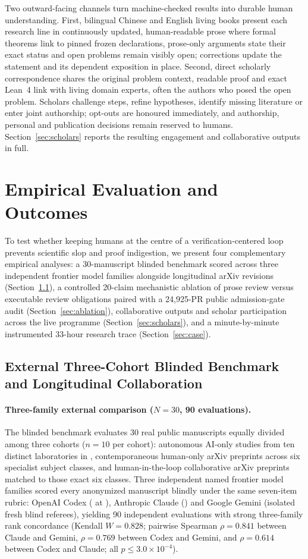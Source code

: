 \documentclass[11pt,a4paper]{article}
\newcommand{\code}[1]{\texttt{\detokenize{#1}}}
\begin{document}
Two outward-facing channels turn machine-checked results into durable human
understanding. First, bilingual Chinese and English living books present each
research line in continuously updated, human-readable prose where formal
theorems link to pinned frozen declarations, prose-only arguments state their
exact status and open problems remain visibly open; corrections update the
statement and its dependent exposition in place. Second, direct scholarly
correspondence shares the original problem context, readable proof and exact
Lean~4 link with living domain experts, often the authors who posed the open
problem. Scholars challenge steps, refine hypotheses, identify missing
literature or enter joint authorship; opt-outs are honoured immediately, and
authorship, personal and publication decisions remain reserved to humans.
Section~\ref{sec:scholars} reports the resulting engagement and collaborative
outputs in full.

\section{Empirical Evaluation and Outcomes}
\label{sec:results}
To test whether keeping humans at the centre of a verification-centered loop
prevents scientific slop and proof indigestion, we present four complementary
empirical analyses: a 30-manuscript blinded benchmark scored across three
independent frontier model families alongside longitudinal arXiv revisions
(Section~\ref{sec:benchmark}), a controlled 20-claim mechanistic ablation of
prose review versus executable review obligations paired with a 24,925-PR
public admission-gate audit (Section~\ref{sec:ablation}), collaborative
outputs and scholar participation across the live programme
(Section~\ref{sec:scholars}), and a minute-by-minute instrumented 33-hour
research trace (Section~\ref{sec:case}).

\subsection{External Three-Cohort Blinded Benchmark and Longitudinal Collaboration}
\label{sec:benchmark}
\paragraph{Three-family external comparison ($N=30$, 90 evaluations).}
The blinded benchmark evaluates 30 real public manuscripts equally divided
among three cohorts ($n=10$ per cohort): autonomous AI-only studies from ten
distinct laboratories in \code{alphaXiv/AgentAlphaXiv}, contemporaneous
human-only arXiv preprints across six specialist subject classes, and
human-in-the-loop collaborative arXiv preprints matched to those exact six
classes. Three independent named frontier model families scored every
anonymized manuscript blindly under the same seven-item rubric: OpenAI Codex
(\code{gpt-6.1-sol} at \code{xhigh}), Anthropic Claude
(\code{claude-opus-5-5}) and Google Gemini (isolated fresh blind referees),
yielding 90 independent evaluations with strong three-family rank concordance
(Kendall $W=0.828$; pairwise Spearman $\rho=0.841$ between Claude and Gemini,
$\rho=0.769$ between Codex and Gemini, and $\rho=0.614$ between Codex and
Claude; all $p\le 3.0\times10^{-4}$).
\end{document}
